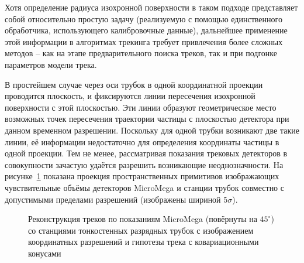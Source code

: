 Хотя определение радиуса изохронной поверхности в таком подходе
представляет собой относительно простую задачу (реализуемую с помощью
единственного обработчика, использующего калибровочные данные),
дальнейшее применение этой информации в алгоритмах трекинга требует
привлечения более сложных методов -- как на этапе предварительного
поиска треков, так и при подгонке параметров модели трека. 

В простейшем случае через оси трубок в одной координатной проекции
проводится плоскость, и фиксируются линии пересечения изохронной
поверхности с этой плоскостью. Эти линии образуют геометрическое
место возможных точек пересечения траектории частицы с плоскостью
детектора при данном временном разрешении. Поскольку для одной трубки
возникают две такие линии, её информации недостаточно для определения
координаты частицы в одной проекции. Тем не менее, рассматривая показания
трековых детекторов в совокупности зачастую удаётся разрешить
возникающие неоднозначности. На рисунке~\ref{fig:evdisplay-new}
показана проекция пространственных примитивов изображающих
чувствительные объёмы детекторов MicroMega и станции трубок
совместно с допустимыми пределами разрешений (изображены
шириной $5\sigma$).

\begin{figure}[ht]
    \caption{Реконструкция треков по показаниям MicroMega (повёрнуты на $45^{\circ}$)
    со станциями тонкостенных разрядных трубок с изображением
    координатных разрешений и гипотезы трека с ковариационными конусами}
    \label{fig:evdisplay-new}
\end{figure}

